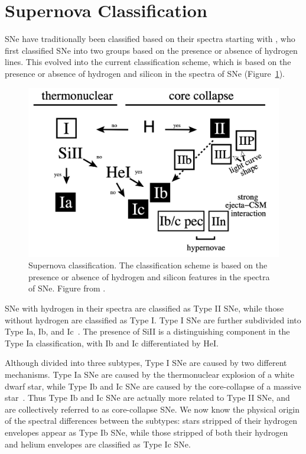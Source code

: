 \section{Supernova Classification}
\label{sec:supernova-classification}
SNe have traditionally been classified based on their spectra starting with 
\textcite{Minkowski1941}, who first classified SNe into two groups based on the
presence or absence of hydrogen lines. This evolved into 
the current classification scheme, which is based on the presence
or absence of hydrogen and silicon in the spectra of SNe (Figure~\ref{fig:sn-classification}). 

\begin{figure}[t]
    \centering
    \includegraphics[width=0.8\linewidth]{figures/supernova_class.png }
    \caption[Supernova Classification]{Supernova classification. The 
    classification scheme is based on the presence or absence of hydrogen and 
    silicon features in the spectra of SNe. Figure from \textcite{Turatto2003}.}
    \label{fig:sn-classification}
\end{figure}

SNe with hydrogen in their spectra are classified as Type II SNe, while those
without hydrogen are classified as Type I. Type I SNe are further
subdivided into Type Ia, Ib, and Ic~\parencite{Turatto2003}. The presence of 
SiII is a distinguishing component in the Type Ia classification, with Ib and Ic 
differentiated by HeI. 

Although divided into three 
subtypes, Type I SNe are caused by two different mechanisms. Type Ia SNe are 
caused by the thermonuclear explosion of a white dwarf star, while Type Ib and Ic 
SNe are caused by the core-collapse of a massive star~\parencite{Filippenko1997}.
Thus Type Ib and Ic SNe are actually more related to Type II SNe,
and are collectively referred to as core-collapse SNe. We now know the physical
origin of the spectral differences between the subtypes: stars stripped of their 
hydrogen envelopes appear as Type Ib SNe, while those stripped of both their 
hydrogen and helium envelopes are classified as Type Ic SNe.

